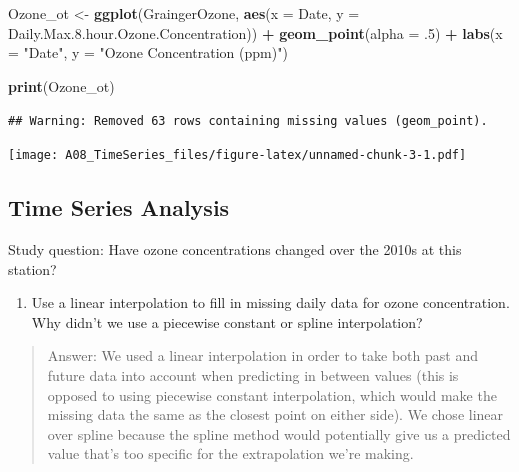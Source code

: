 \documentclass[]{article}
\newenvironment{Shaded}{\begin{snugshade}}{\end{snugshade}}
\newcommand{\DataTypeTok}[1]{\textcolor[rgb]{0.13,0.29,0.53}{#1}}
\newcommand{\FloatTok}[1]{\textcolor[rgb]{0.00,0.00,0.81}{#1}}
\newcommand{\KeywordTok}[1]{\textcolor[rgb]{0.13,0.29,0.53}{\textbf{#1}}}
\newcommand{\NormalTok}[1]{#1}
\newcommand{\OperatorTok}[1]{\textcolor[rgb]{0.81,0.36,0.00}{\textbf{#1}}}
\newcommand{\StringTok}[1]{\textcolor[rgb]{0.31,0.60,0.02}{#1}}
\providecommand{\tightlist}{%
  \setlength{\itemsep}{0pt}\setlength{\parskip}{0pt}}
\begin{document}
\hypertarget{section-2}{%
\section{}\label{section-2}}

\begin{Shaded}
\begin{Highlighting}[]
\NormalTok{Ozone_ot <-}
\StringTok{   }\KeywordTok{ggplot}\NormalTok{(GraingerOzone, }\KeywordTok{aes}\NormalTok{(}\DataTypeTok{x =}\NormalTok{ Date, }\DataTypeTok{y =}\NormalTok{ Daily.Max.}\FloatTok{8.}\NormalTok{hour.Ozone.Concentration)) }\OperatorTok{+}
\StringTok{   }\KeywordTok{geom_point}\NormalTok{(}\DataTypeTok{alpha =} \FloatTok{.5}\NormalTok{) }\OperatorTok{+}
\StringTok{   }\KeywordTok{labs}\NormalTok{(}\DataTypeTok{x =} \StringTok{"Date"}\NormalTok{, }\DataTypeTok{y =} \StringTok{"Ozone Concentration (ppm)"}\NormalTok{)}

 \KeywordTok{print}\NormalTok{(Ozone_ot)}
\end{Highlighting}
\end{Shaded}

\begin{verbatim}
## Warning: Removed 63 rows containing missing values (geom_point).
\end{verbatim}

\texttt{[image: A08\_TimeSeries\_files/figure-latex/unnamed-chunk-3-1.pdf]}

\hypertarget{time-series-analysis}{%
\subsection{Time Series Analysis}\label{time-series-analysis}}

Study question: Have ozone concentrations changed over the 2010s at this
station?

\begin{enumerate}
\def\labelenumi{\arabic{enumi}.}
\setcounter{enumi}{7}
\tightlist
\item
  Use a linear interpolation to fill in missing daily data for ozone
  concentration. Why didn't we use a piecewise constant or spline
  interpolation?
\end{enumerate}

\begin{quote}
Answer: We used a linear interpolation in order to take both past and
future data into account when predicting in between values (this is
opposed to using piecewise constant interpolation, which would make the
missing data the same as the closest point on either side). We chose
linear over spline because the spline method would potentially give us a
predicted value that's too specific for the extrapolation we're making.
\end{quote}
\end{document}
